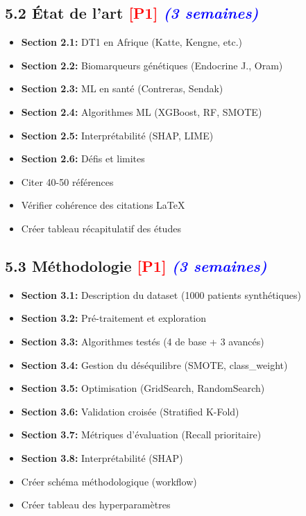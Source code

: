 \documentclass[a4paper,11pt]{article}
\newcommand{\checkbox}{\large$\square$}
\newcommand{\priorite}[1]{\textcolor{red}{\textbf{[#1]}}}
\newcommand{\duree}[1]{\textcolor{blue}{\textit{(#1)}}}
\begin{document}
\subsection*{5.2 État de l'art \priorite{P1} \duree{3 semaines}}

\begin{itemize}[label=\checkbox]
    \item \textbf{Section 2.1:} DT1 en Afrique (Katte, Kengne, etc.)
    \item \textbf{Section 2.2:} Biomarqueurs génétiques (Endocrine J., Oram)
    \item \textbf{Section 2.3:} ML en santé (Contreras, Sendak)
    \item \textbf{Section 2.4:} Algorithmes ML (XGBoost, RF, SMOTE)
    \item \textbf{Section 2.5:} Interprétabilité (SHAP, LIME)
    \item \textbf{Section 2.6:} Défis et limites
    \item Citer 40-50 références
    \item Vérifier cohérence des citations LaTeX
    \item Créer tableau récapitulatif des études
\end{itemize}

\subsection*{5.3 Méthodologie \priorite{P1} \duree{3 semaines}}

\begin{itemize}[label=\checkbox]
    \item \textbf{Section 3.1:} Description du dataset (1000 patients synthétiques)
    \item \textbf{Section 3.2:} Pré-traitement et exploration
    \item \textbf{Section 3.3:} Algorithmes testés (4 de base + 3 avancés)
    \item \textbf{Section 3.4:} Gestion du déséquilibre (SMOTE, class\_weight)
    \item \textbf{Section 3.5:} Optimisation (GridSearch, RandomSearch)
    \item \textbf{Section 3.6:} Validation croisée (Stratified K-Fold)
    \item \textbf{Section 3.7:} Métriques d'évaluation (Recall prioritaire)
    \item \textbf{Section 3.8:} Interprétabilité (SHAP)
    \item Créer schéma méthodologique (workflow)
    \item Créer tableau des hyperparamètres
\end{itemize}
\end{document}
